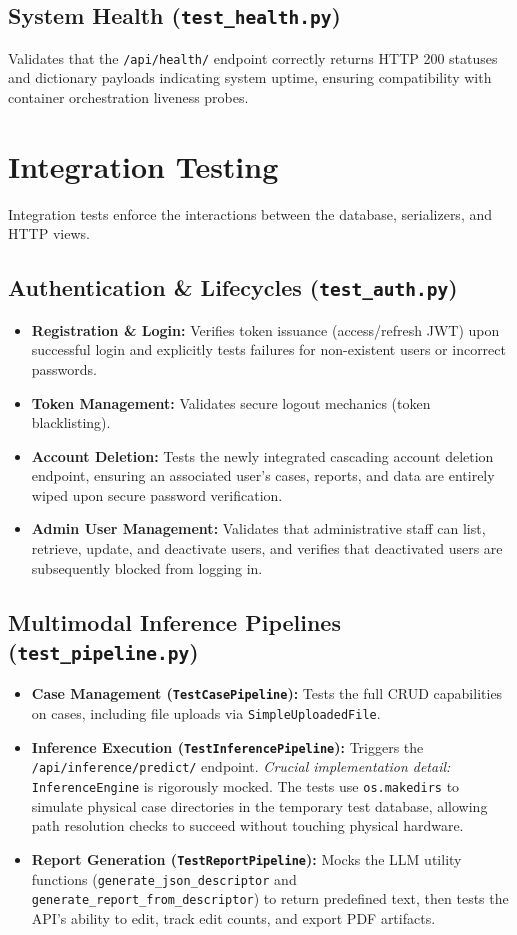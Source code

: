 \documentclass[11pt, a4paper]{article}
\begin{document}
\subsection{System Health (\texttt{test\_health.py})}
Validates that the \texttt{/api/health/} endpoint correctly returns HTTP 200 statuses and dictionary payloads indicating system uptime, ensuring compatibility with container orchestration liveness probes.

\section{Integration Testing}
Integration tests enforce the interactions between the database, serializers, and HTTP views.

\subsection{Authentication \& Lifecycles (\texttt{test\_auth.py})}
\begin{itemize}
    \item \textbf{Registration \& Login:} Verifies token issuance (access/refresh JWT) upon successful login and explicitly tests failures for non-existent users or incorrect passwords.
    \item \textbf{Token Management:} Validates secure logout mechanics (token blacklisting).
    \item \textbf{Account Deletion:} Tests the newly integrated cascading account deletion endpoint, ensuring an associated user's cases, reports, and data are entirely wiped upon secure password verification.
    \item \textbf{Admin User Management:} Validates that administrative staff can list, retrieve, update, and deactivate users, and verifies that deactivated users are subsequently blocked from logging in.
\end{itemize}

\subsection{Multimodal Inference Pipelines (\texttt{test\_pipeline.py})}
\begin{itemize}
    \item \textbf{Case Management (\texttt{TestCasePipeline}):} Tests the full CRUD capabilities on cases, including file uploads via \texttt{SimpleUploadedFile}.
    \item \textbf{Inference Execution (\texttt{TestInferencePipeline}):} Triggers the \texttt{/api/inference/predict/} endpoint. \textit{Crucial implementation detail:} \texttt{InferenceEngine} is rigorously mocked. The tests use \texttt{os.makedirs} to simulate physical case directories in the temporary test database, allowing path resolution checks to succeed without touching physical hardware.
    \item \textbf{Report Generation (\texttt{TestReportPipeline}):} Mocks the LLM utility functions (\texttt{generate\_json\_descriptor} and \texttt{generate\_report\_from\_descriptor}) to return predefined text, then tests the API's ability to edit, track edit counts, and export PDF artifacts.
\end{itemize}
\end{document}
